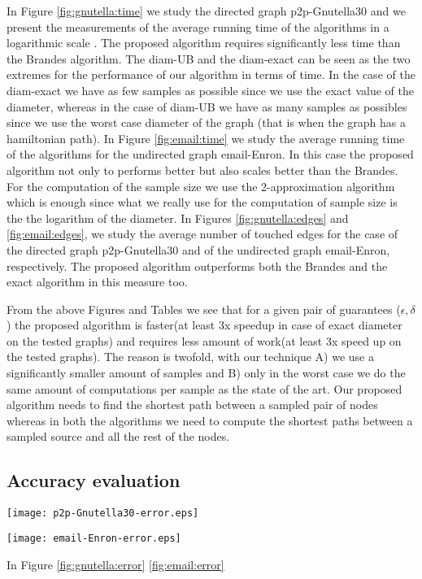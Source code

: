 In Figure \ref{fig:gnutella:time} we study the directed graph p2p-Gnutella30 and we present the measurements of the average running time of the algorithms in a logarithmic scale .
The proposed algorithm requires significantly less time than the Brandes algorithm.
The diam-UB and the diam-exact can be seen as the two extremes for the performance of our algorithm in terms of time.
In the case of the diam-exact we have as few samples as possible since we use the exact value of the diameter, whereas in the case of diam-UB we have as many samples as possibles since we use the worst case diameter of the graph (that is when the graph has a hamiltonian path).
In Figure \ref{fig:email:time} we study the average running time of the algorithms for the undirected graph email-Enron.
In this case the proposed algorithm not only to performs better but also scales better than the Brandes.
For the computation of the sample size we use the 2-approximation algorithm which is enough since what we really use for the computation of sample size is the the logarithm of the diameter.
In Figures \ref{fig:gnutella:edges} and \ref{fig:email:edges}, we study the average number of touched edges for the case of the directed graph p2p-Gnutella30 and of the undirected graph email-Enron, respectively.
The proposed algorithm outperforms both the Brandes and the exact algorithm in this measure too.


From the above Figures and Tables we see that for a given pair of guarantees ($\epsilon,\delta$) the proposed algorithm is faster(at least 3x speedup in case of exact diameter on the tested graphs) and requires less amount of work(at least 3x speed up on the tested graphs).
The reason is twofold, with our technique A) we use a significantly smaller amount of samples and B) only in the worst case we do the same amount of computations per sample as the state of the art.
Our proposed algorithm needs to find the shortest path between a sampled pair of nodes whereas in both the algorithms  we need to compute the shortest paths between a sampled source and all the rest of the nodes.





\subsection{Accuracy evaluation}\label{sec:accuracy}

\begin{figure*}
\begin{minipage}[b]{0.5\linewidth}
\flushleft
\texttt{[image: p2p-Gnutella30-error.eps]}
\caption{-} \label{fig:gnutella:error}
\end{minipage}%
\begin{minipage}[b]{0.5\linewidth}
\centering
\texttt{[image: email-Enron-error.eps]}
\caption{-} \label{fig:email:error}
\end{minipage}
\end{figure*}
In Figure \ref{fig:gnutella:error} \ref{fig:email:error}


